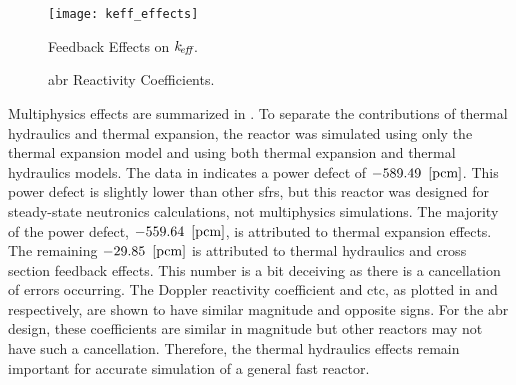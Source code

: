   \begin{figure}
    \centering
    \texttt{[image: keff\_effects]}
    \caption{Feedback Effects on $k_{\!\mbox{\scriptsize \em eff}}$.}
    \label{fig:keff_effects}
  \end{figure}

  \begin{figure}
    \centering
    \hspace*{\fill}
    \vspace{\baselineskip}
    \hspace*{\fill}
    \caption{\gls{abr} Reactivity Coefficients.}
    \label{fig:abr_reactivity_coefficients}
  \end{figure}

  Multiphysics effects are summarized in . To
  separate the contributions of thermal hydraulics and thermal expansion, the
  reactor was simulated using only the thermal expansion model and using both
  thermal expansion and thermal hydraulics models.  The data in
   indicates a power defect of
  $-589.49~\left[\text{{pcm}}\right]$.  This power defect is slightly lower than other
  \glspl{sfr}, but this reactor was designed for steady-state neutronics
  calculations, not multiphysics simulations. The majority of the power defect,
  $-559.64~\left[\text{{pcm}}\right]$, is attributed to thermal expansion effects.
  The remaining $-29.85~\left[\text{{pcm}}\right]$ is attributed to thermal hydraulics and 
  cross section feedback effects. This number is a bit deceiving as there is a
  cancellation of errors occurring. The Doppler reactivity coefficient and
  \gls{ctc}, as plotted in  and
   respectively, are shown
  to have similar magnitude and opposite signs. For the \gls{abr} design, these
  coefficients are similar in magnitude but other reactors may not have such a
  cancellation. Therefore, the thermal hydraulics effects remain important for
  accurate simulation of a general fast reactor.

